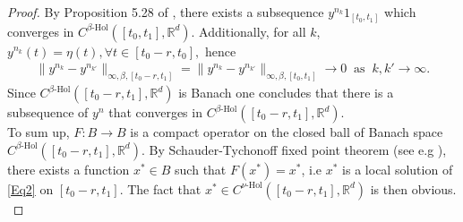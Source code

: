 \documentclass[graybox]{svmult}
\newcommand{\R}{\ensuremath{\mathbb{R}}}
\begin{document}
\begin{proof}
	By Proposition 5.28 of \cite{friz}, there exists a subsequence $y^{n_k}1_{[t_0,t_1]}$ which converges in $C^{\beta\text{-Hol}}([t_0,t_1],\R^d)$. Additionally, for all $k$, $y^{n_k}(t) = \eta(t), \forall t\in [t_0-r,t_0], $ hence
	\begin{eqnarray*}
		\|y^{n_k}-y^{n_{k'}}\|_{\infty,\beta,[t_0-r,t_1]}=\|y^{n_k}-y^{n_{k'}}\|_{\infty,\beta,[t_0,t_1]} \to 0 \;\; \text{as}\;\; k,k'\to \infty.
	\end{eqnarray*}
	Since $C^{\beta\text{-Hol}}([t_0-r,t_1],\R^d)$ is Banach one concludes that there is a subsequence of $y^n$ that converges in $C^{\beta\text{-Hol}}([t_0-r,t_1],\R^d)$. \\
	To sum up, $F:B\rightarrow B$ is a compact operator on the closed ball of Banach space $C^{\beta\text{-Hol}}([t_0-r,t_1],\R^d)$. By Schauder-Tychonoff fixed point  theorem (see e.g \cite[Theorem 2.A, p. 56]{Zeidler}),  there exists a function $x^*\in B$ such that $F(x^*)=x^*$, i.e $x^*$ is a local solution of \eqref{Eq2} on $[t_0-r,t_1]$. The fact that $x^* \in C^{\nu \text{-Hol}}([t_0-r,t_1],\R^d)$ is then obvious.  \\
	

\end{proof}
\end{document}
